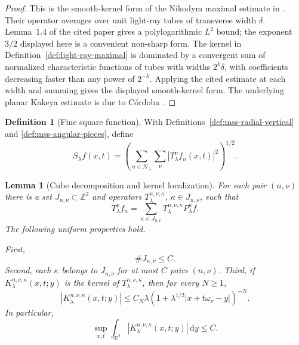 \documentclass[11pt]{article}
\numberwithin{equation}{section}
\newtheorem{lemma}[theorem]{Lemma}
\theoremstyle{definition}
\newtheorem{definition}[theorem]{Definition}
\theoremstyle{remark}
\newcommand{\R}{\mathbb R}
\newcommand{\Z}{\mathbb Z}
\newcommand{\dd}{\,\mathrm d}
\begin{document}
\begin{proof}
This is the smooth-kernel form of the Nikodym maximal estimate in \cite[Lemma~1.4]{MSS1992}.  Their operator averages over unit light-ray tubes of transverse width $\delta$.  Lemma~1.4 of the cited paper gives a polylogarithmic $L^2$ bound; the exponent $3/2$ displayed here is a convenient non-sharp form.  The kernel in Definition~\ref{def:light-ray-maximal} is dominated by a convergent sum of normalized characteristic functions of tubes with widths $2^k\delta$, with coefficients decreasing faster than any power of $2^{-k}$.  Applying the cited estimate at each width and summing gives the displayed smooth-kernel form.  The underlying planar Kakeya estimate is due to C\'ordoba \cite{Cordoba1982}.
\end{proof}

\begin{definition}[Fine square function]\label{def:mss-fine-square-function}
With Definitions~\ref{def:mss-radial-vertical} and \ref{def:mss-angular-pieces}, define
\[
S_\lambda f(x,t)
=\left(\sum_{n\in\mathcal N_\lambda}\sum_\nu
|T_\lambda^\nu f_n(x,t)|^2\right)^{1/2}.
\]
\end{definition}

\begin{lemma}[Cube decomposition and kernel localization]\label{lem:mss-fine-kernel}
For each pair $(n,\nu)$ there is a set $J_{n,\nu}\subset\Z^2$ and operators $T_\lambda^{n,\nu,\kappa}$, $\kappa\in J_{n,\nu}$, such that
\[
T_\lambda^\nu f_n
=\sum_{\kappa\in J_{n,\nu}}T_\lambda^{n,\nu,\kappa}P_\lambda^\kappa f.
\]
The following uniform properties hold.

First,
\[
\#J_{n,\nu}\le C.
\]
Second, each $\kappa$ belongs to $J_{n,\nu}$ for at most $C$ pairs $(n,\nu)$.  Third, if $K_\lambda^{n,\nu,\kappa}(x,t;y)$ is the kernel of $T_\lambda^{n,\nu,\kappa}$, then for every $N\ge1$,
\[
|K_\lambda^{n,\nu,\kappa}(x,t;y)|
\le C_N\lambda
(1+\lambda^{1/2}|x+t\omega_\nu-y|)^{-N}.
\]
In particular,
\[
\sup_{x,t}\int_{\R^2}|K_\lambda^{n,\nu,\kappa}(x,t;y)|\dd y\le C.
\]
\end{lemma}
\end{document}

